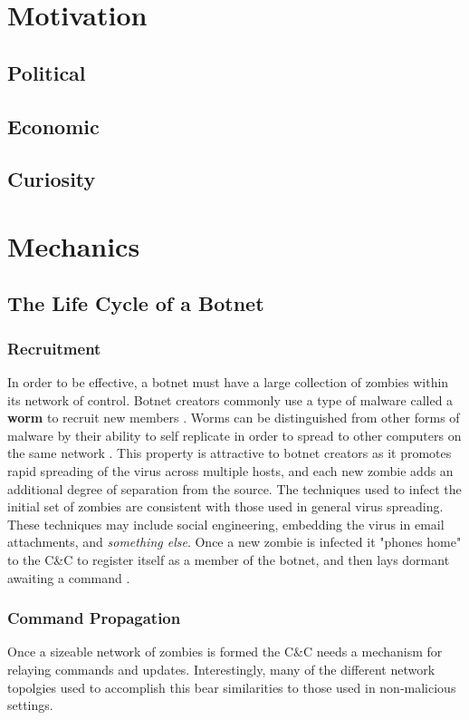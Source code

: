\section{Motivation}
\subsection{Political}
\subsection{Economic}
\subsection{Curiosity}

\section{Mechanics}

\subsection{The Life Cycle of a Botnet}
\subsubsection{Recruitment}
In order to be effective, a botnet must have a large collection of zombies within its network of control.
Botnet creators commonly use a type of malware called a \textbf{worm} to recruit new members
\cite{lifecycle}.
Worms can be distinguished from other forms of malware by their ability to self replicate
in order to spread to other computers on the same network \cite{virustypes}.
This property is attractive to botnet creators as it promotes rapid spreading of the virus across
multiple hosts, and each new zombie adds an additional degree of separation from the source.
The techniques used to infect the initial set of zombies are consistent with
those used in general virus spreading.  These techniques may include social engineering,
embedding the virus in email attachments, and \textit{something else}.
Once a new zombie is infected it "phones home" to the C\&C to register
itself as a member of the botnet, and then lays dormant awaiting a command
\cite{topology}.

\subsubsection{Command Propagation}
Once a sizeable network of zombies is formed the C\&C needs a mechanism for
relaying commands and updates. Interestingly, many of the different network topolgies
used to accomplish this bear similarities to those used in non-malicious settings.

